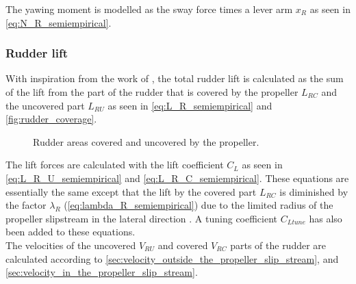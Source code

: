 %
\begin{equation}
    \label{eq:kappa_v_tot_semiempirical}
    
\end{equation}
%
\begin{equation}
    \label{eq:gamma_g_semiempirical}
    
\end{equation}
The yawing moment is modelled as the sway force times a lever arm $x_R$ as seen in \autoref{eq:N_R_semiempirical}.
\begin{equation}
    \label{eq:N_R_semiempirical}
    
\end{equation}
%
%
\subsubsection{Rudder lift}
\label{sec:rudder lift}
With inspiration from the work of \citet{villa_numerical_2020}, the total rudder lift is calculated as the sum of the lift from the part of the rudder that is covered by the propeller $L_{RC}$ and the uncovered part $L_{RU}$ as seen in \autoref{eq:L_R_semiempirical} and \autoref{fig:rudder_coverage}.
\begin{equation}
    \label{eq:L_R_semiempirical}
    
\end{equation}
%
\begin{figure}[h]
    \centering
    
    \caption{Rudder areas covered and uncovered by the propeller.}
    \label{fig:rudder_coverage}
\end{figure}
%
The lift forces are calculated with the lift coefficient $C_L$ as seen in \autoref{eq:L_R_U_semiempirical} and \autoref{eq:L_R_C_semiempirical}. These equations are essentially the same except that the lift by the covered part $L_{RC}$ is diminished by the factor $\lambda_R$ (\autoref{eq:lambda_R_semiempirical}) due to the limited radius of the propeller slipstream in the lateral direction \citep{brix_manoeuvring_1993}. A tuning coefficient $C_{Ltune}$ has also been added to these equations.
\begin{equation}
    \label{eq:L_R_U_semiempirical}
    
\end{equation}
%
\begin{equation}
    \label{eq:L_R_C_semiempirical}
    
\end{equation}
The velocities of the uncovered $V_{RU}$ and covered $V_{RC}$ parts of the rudder are calculated according to \ref{sec:velocity_outside_the_propeller_slip_stream}, and \ref{sec:velocity_in_the_propeller_slip_stream}.

